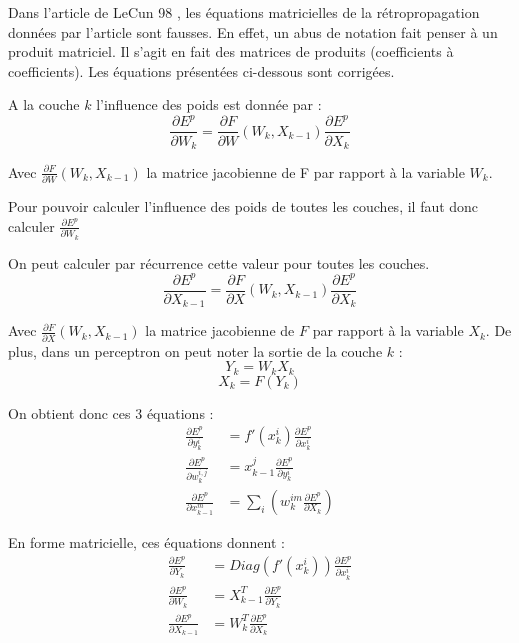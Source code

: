 \begin{remark}
Dans l'article de LeCun 98 \cite{lecun_efficient_1998}, les équations matricielles de la rétropropagation données par l’article sont fausses. 
En effet, un abus de notation fait penser à un produit matriciel. Il s’agit en fait des matrices de produits (coefficients à coefficients).
Les équations présentées ci-dessous sont corrigées.
\end{remark}

A la couche $k$ l'influence des poids est donnée par : 
\[
	\frac{\partial E^p}{\partial W _k} = \frac{\partial F}{\partial W}(W_k, X_{k-1})\frac{\partial E^p}{\partial X_k}
\]

Avec $\frac{\partial F}{\partial W}(W_k, X_{k-1})$ la matrice jacobienne de F par rapport à la variable $W_k$.

Pour pouvoir calculer l'influence des poids de toutes les couches, il faut donc calculer $\frac{\partial E^p}{\partial W_k}$

On peut calculer par récurrence cette valeur pour toutes les couches.
\[
	\frac{\partial E^p}{\partial X _{k-1}} = \frac{\partial F}{\partial X}(W_k, X_{k-1})\frac{\partial E^p}{\partial X_k}
\]

Avec $\frac{\partial F}{\partial X }(W_k, X_{k-1})$ la matrice jacobienne de $F$ par rapport à la variable $X_k$. De plus, dans un perceptron on peut noter la sortie de la couche $k$ : 
\[
Y_k = W_k X_k \]
\[
X_k = F(Y_k)
\]

On obtient donc ces 3 équations : 
\begin{align*}
\frac{\partial E^p}{\partial y_k^i} &= f'(x_k^i)\frac{\partial E^p}{\partial x_k^i} \\
\frac{\partial E^p}{\partial w_k^{i,j}}&= x^j_{k-1} \frac{\partial E^p}{\partial y_k^i}\\
\frac{\partial E^p}{\partial x_{k-1}^m} &= \sum_i(w_k^{im}\frac{\partial E^p}{\partial X_k})
\end{align*}

En forme matricielle, ces équations donnent :
\begin{align*}
\frac{\partial E^p}{\partial Y_k} &= Diag(f'(x_k^i))\frac{\partial E^p}{\partial x_k^i} \\
\frac{\partial E^p}{\partial W_k}&= X^T_{k-1} \frac{\partial E^p}{\partial Y_k}\\
\frac{\partial E^p}{\partial X_{k-1}} &= W_k^T\frac{\partial E^p}{\partial X_k}
\end{align*}

